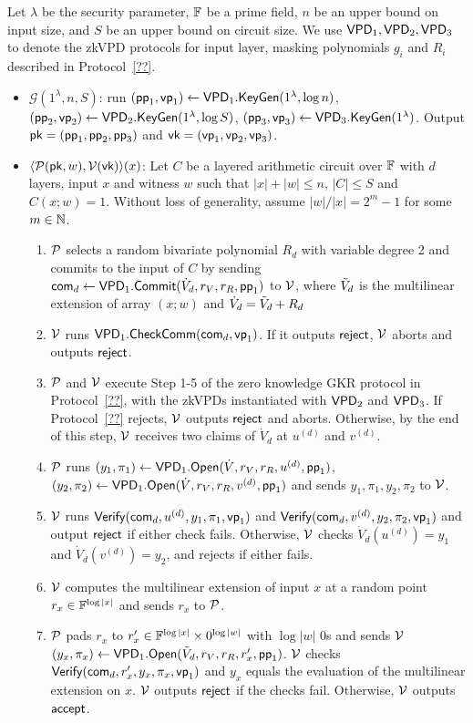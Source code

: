\begin{protocol}
	Let $\lambda$ be the security parameter, $\F$ be a prime field, $n$ be an upper bound on input size, and $S$ be an upper bound on circuit size. We use $\VPD_1, \VPD_2, \VPD_3$ to denote the zkVPD protocols for input layer, masking polynomials $g_i$ and $R_i$ described in Protocol~\ref{??}.
	\begin{itemize}
		\item $\mathcal{G}(1^\lambda, n, S)$: run $(\pp_1,\vp_1)\leftarrow\VPD_1.\KeyGen(1^\lambda, \log n)$, $(\pp_2,\vp_2)\leftarrow\VPD_2.\KeyGen(1^\lambda, \log S)$, $(\pp_3,\vp_3)\leftarrow\VPD_3.\KeyGen(1^\lambda)$. Output $\pk = (\pp_1, \pp_2, \pp_3)$ and $\vk = (\vp_1, \vp_2, \vp_3)$.
		
		\item $\langle\P(\pk,w), \V(\vk)\rangle(x)$: Let $C$ be a layered arithmetic circuit over $\F$ with $d$ layers, input $x$ and witness $w$ such that $|x|+|w|\le n$, $|C|\le S$ and $C(x;w) =1$. Without loss of generality, assume $|w|/|x| = 2^m -1$ for some $m\in\N$.
		\begin{enumerate}
			\item $\P$ selects a random bivariate polynomial $R_d$ with variable degree 2 and commits to the input of $C$ by sending $\comm_d\leftarrow\VPD_1.\Commit(\dot{V}_d, r_V, r_R, \pp_1)$ to $\V$, where $\tV_d$ is the multilinear extension of array $(x;w)$ and $\dot{V}_d=\tV_d+R_d$
			\item $\V$ runs $\VPD_1.\CheckComm(\comm_d,\vp_1)$. If it outputs $\reject$, $\V$ aborts and outputs $\reject$.  
			\item $\P$ and $\V$ execute Step 1-5 of the zero knowledge GKR protocol in Protocol~\ref{??}, with the zkVPDs instantiated with $\VPD_2$ and $\VPD_3$. If Protocol~\ref{??} rejects, $\V$ outputs $\reject$ and aborts. Otherwise, by the end of this step, $\V$ receives two claims of $\dot{V}_d$ at $u^{(d)}$ and $v^{(d)}$.
			\item $\P$ runs $(y_1,\pi_1)\leftarrow\VPD_1.\Open(\dot{V}, r_V, r_R,u^{(d)},\pp_1)$,  $(y_2,\pi_2)\leftarrow\VPD_1.\Open(\dot{V}, r_V, r_R, v^{(d)},\pp_1)$ and sends $y_1,\pi_1,y_2,\pi_2$ to $\V$.
			\item $\V$ runs $\Verify(\comm_d,u^{(d)},y_1,\pi_1,\vp_1)$ and $\Verify(\comm_d,v^{(d)},y_2,\pi_2,\vp_1)$ and output $\reject$ if either check fails. Otherwise, $\V$ checks $\dot{V}_d(u^{(d)}) = y_1$ and $\dot{V}_d(v^{(d)}) = y_2$, and rejects if either fails.
			\item $\V$ computes the multilinear extension of input $x$ at a random point $r_x\in\F^{\log |x|}$ and sends $r_x$ to $\P$.
			\item $\P$ pads $r_x$ to $r'_x\in\F^{\log |x|}\times 0^{\log |w|}$ with $\log |w|$ 0s and sends $\V$ $(y_x,\pi_x)\leftarrow\VPD_1.\Open(\tV_d, r_V, r_R, r'_x,\pp_1)$. $\V$ checks $\Verify(\comm_d,r'_x,y_x,\pi_x,\vp_1)$ and $y_x$ equals the evaluation of the multilinear extension on $x$. $\V$ outputs $\reject$ if the checks fail. Otherwise, $\V$ outputs $\accept$.
		\end{enumerate}
		
	\end{itemize}
\end{protocol}

